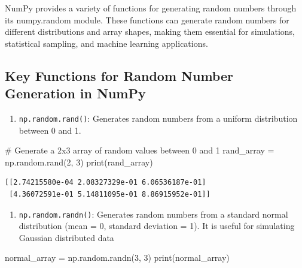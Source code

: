\documentclass[
  letterpaper,
  DIV=11,
  numbers=noendperiod]{scrreprt}
\newenvironment{Shaded}{\begin{snugshade}}{\end{snugshade}}
\newcommand{\BuiltInTok}[1]{\textcolor[rgb]{0.00,0.23,0.31}{#1}}
\newcommand{\CommentTok}[1]{\textcolor[rgb]{0.37,0.37,0.37}{#1}}
\newcommand{\DecValTok}[1]{\textcolor[rgb]{0.68,0.00,0.00}{#1}}
\newcommand{\NormalTok}[1]{\textcolor[rgb]{0.00,0.23,0.31}{#1}}
\newcommand{\OperatorTok}[1]{\textcolor[rgb]{0.37,0.37,0.37}{#1}}
\providecommand{\tightlist}{%
  \setlength{\itemsep}{0pt}\setlength{\parskip}{0pt}}\usepackage{longtable,booktabs,array}
\begin{document}
NumPy provides a variety of functions for generating random numbers
through its numpy.random module. These functions can generate random
numbers for different distributions and array shapes, making them
essential for simulations, statistical sampling, and machine learning
applications.

\hypertarget{key-functions-for-random-number-generation-in-numpy}{%
\subsection{Key Functions for Random Number Generation in
NumPy}\label{key-functions-for-random-number-generation-in-numpy}}

\begin{enumerate}
\def\labelenumi{\arabic{enumi}.}
\tightlist
\item
  \texttt{np.random.rand()}: Generates random numbers from a uniform
  distribution between 0 and 1.
\end{enumerate}

\begin{Shaded}
\begin{Highlighting}[]
\CommentTok{\# Generate a 2x3 array of random values between 0 and 1}
\NormalTok{rand\_array }\OperatorTok{=}\NormalTok{ np.random.rand(}\DecValTok{2}\NormalTok{, }\DecValTok{3}\NormalTok{)}
\BuiltInTok{print}\NormalTok{(rand\_array)}
\end{Highlighting}
\end{Shaded}

\begin{verbatim}
[[2.74215580e-04 2.08327329e-01 6.06536187e-01]
 [4.36072591e-01 5.14811095e-01 8.86915952e-01]]
\end{verbatim}

\begin{enumerate}
\def\labelenumi{\arabic{enumi}.}
\setcounter{enumi}{1}
\tightlist
\item
  \texttt{np.random.randn()}: Generates random numbers from a standard
  normal distribution (mean = 0, standard deviation = 1). It is useful
  for simulating Gaussian distributed data
\end{enumerate}

\begin{Shaded}
\begin{Highlighting}[]
\NormalTok{normal\_array }\OperatorTok{=}\NormalTok{ np.random.randn(}\DecValTok{3}\NormalTok{, }\DecValTok{3}\NormalTok{)}
\BuiltInTok{print}\NormalTok{(normal\_array)}
\end{Highlighting}
\end{Shaded}
\end{document}
